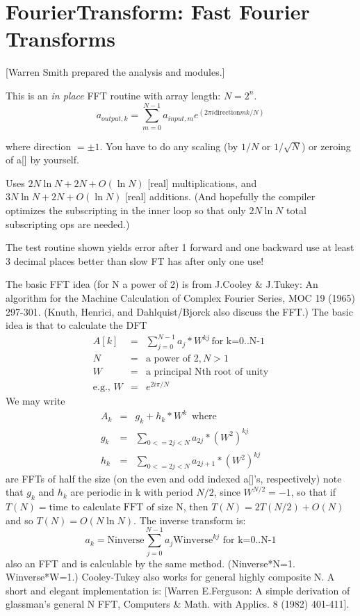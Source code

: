 \section{FourierTransform: Fast Fourier Transforms}
[Warren Smith prepared the analysis and modules.]

This is an {\em in place} FFT routine with array length:  $N = 2^n$.
\begin{equation}
 a_{output,k} = \sum_{m=0}^{N-1} a_{input,m} 
        e^{(2 \pi i \mbox{direction} m k/N)}
\end{equation}

where direction $= \pm 1$.
You have to do any scaling (by $1/N$ or $1/\sqrt{N}$) or zeroing of a[] by
yourself. 

Uses $2N \ln N + 2 N + O(\ln N)$ [real] multiplications, 
and $ 3N \ln N + 2 N + O(\ln N)$ [real] additions.
(And hopefully the compiler optimizes the subscripting in the inner loop so
that only $2 N \ln N$ total subscripting ops are needed.)

The test routine shown yields
error after 1 forward and one backward use
at least 3 decimal places better than
slow FT has after only one use!

The basic FFT idea (for N a power of 2) is from J.Cooley \& J.Tukey:
An algorithm for the Machine Calculation of Complex Fourier Series,
MOC 19 (1965) 297-301. (Knuth, Henrici, and Dahlquist/Bjorck also discuss
the FFT.) The basic idea is that to calculate the DFT
\begin{eqnarray}
    A[k]  & = & \sum_{j=0}^{N-1}a_j*W^{kj}  \, \mbox{for k=0..N-1}\\
    N & = & \mbox{a power of 2,}\, N>1\\
    W & = & \mbox{a principal Nth root of unity}\\
   \mbox{e.g., } W & = & e^{2 i \pi/N}
\end{eqnarray}
We may write
\begin{eqnarray}
    A_k & = & g_k + h_k * W^k \, \mbox{ where}\\
    g_k & = & \sum_{0<=2j<N} a_{2j}   * (W^2)^{k j}\\
    h_k & = & \sum_{0<=2j<N} a_{2j+1} * (W^2)^{k j}
\end{eqnarray}
are FFTs of half the size (on the even and odd indexed a[]'s, respectively)
note that $g_k$ and $h_k$ are periodic in k with period $N/2$, 
since $W^{N/2} = -1$,
so that if $T(N)=\mbox{time to calculate FFT of size N}$, then 
$T(N)=2T(N/2)+O(N)$ and so $T(N)=O(N \ln N)$. The inverse transform is:
\begin{equation}
    a_k  =  \mbox{Ninverse}  \sum_{j=0}^{N-1} a_j 
              \mbox{Winverse}^{k j} \mbox{  for k=0..N-1}
\end{equation}
also an FFT and is calculable by the same method. (Ninverse*N=1. Winverse*W=1.)
Cooley-Tukey also works for general highly composite N.
A short and elegant implementation is:
[Warren E.Ferguson: A simple derivation of glassman's general N FFT,
Computers \& Math. with Applics. 8 (1982) 401-411].

